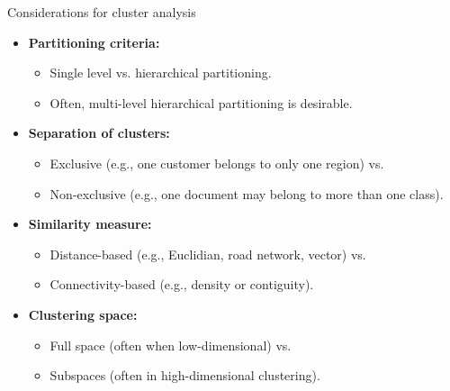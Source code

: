\documentclass[aspectratio=169,t,xcolor=dvipsnames]{beamer}
\begin{document}
  {
    \begin{frame}{Considerations for cluster analysis}
        \begin{itemize}
          \item \textbf{Partitioning criteria:}
          \begin{itemize}
            \item Single level vs. hierarchical partitioning.
            \item Often, multi-level hierarchical partitioning is desirable.
          \end{itemize}
          \item \textbf{Separation of clusters:}
          \begin{itemize}
            \item Exclusive (e.g., one customer belongs to only one region) vs.
            \item Non-exclusive (e.g., one document may belong to more than one class).
          \end{itemize}
          \item \textbf{Similarity measure:}
          \begin{itemize}
            \item Distance-based (e.g., Euclidian, road network, vector) vs.
            \item Connectivity-based (e.g., density or contiguity).
          \end{itemize}
          \item \textbf{Clustering space:}
          \begin{itemize}
            \item Full space (often when low-dimensional) vs.
            \item Subspaces (often in high-dimensional clustering).
          \end{itemize}
        \end{itemize}
    \end{frame}
  }
\end{document}
